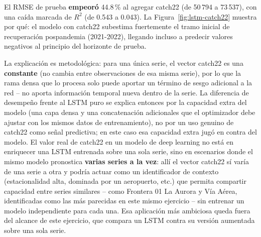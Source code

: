 \documentclass[12pt]{article}
\begin{document}
El RMSE de prueba \textbf{empeoró} 44.8\,\% al agregar catch22 (de 50\,794 a 73\,537), con una
caída marcada de $R^2$ (de 0.543 a 0.043). La Figura~\ref{fig:lstm-catch22} muestra por qué:
el modelo con catch22 subestima fuertemente el tramo inicial de recuperación pospandemia
(2021-2022), llegando incluso a predecir valores negativos al principio del horizonte de
prueba.

La explicación es metodológica: para una única serie, el vector catch22 es una
\textbf{constante} (no cambia entre observaciones de esa misma serie), por lo que la rama
densa que lo procesa solo puede aportar un término de sesgo adicional a la red -- no aporta
información temporal nueva dentro de la serie. La diferencia de desempeño frente al LSTM puro
se explica entonces por la capacidad extra del modelo (una capa densa y una concatenación
adicionales que el optimizador debe ajustar con los mismos datos de entrenamiento), no por un
uso genuino de catch22 como señal predictiva; en este caso esa capacidad extra jugó en contra
del modelo. El valor real de catch22 en un modelo de deep learning no está en enriquecer una
LSTM entrenada sobre una sola serie, sino en escenarios donde el mismo modelo pronostica
\textbf{varias series a la vez}: allí el vector catch22 sí varía de una serie a otra y podría
actuar como un identificador de contexto (estacionalidad alta, dominada por un aeropuerto,
etc.) que permita compartir capacidad entre series similares -- como Frontera 01 La Aurora y
Vía Aérea, identificadas como las más parecidas en este mismo ejercicio -- sin entrenar un
modelo independiente para cada una. Esa aplicación más ambiciosa queda fuera del alcance de
este ejercicio, que compara un LSTM contra su versión aumentada sobre una sola serie.
\end{document}
